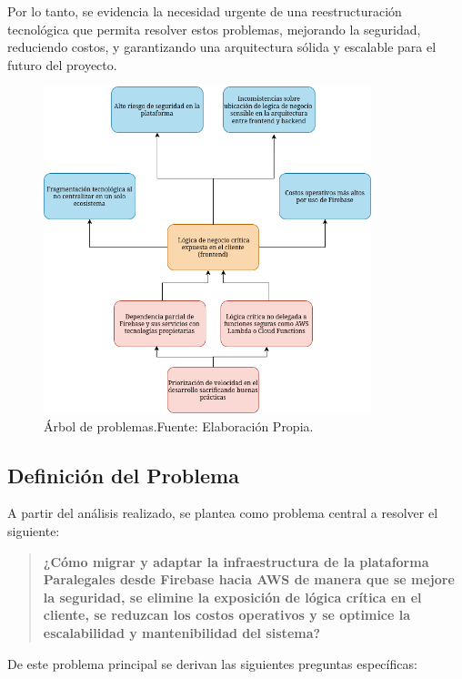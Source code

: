 Por lo tanto, se evidencia la necesidad urgente de una reestructuración tecnológica que permita resolver estos problemas, mejorando la seguridad, reduciendo costos, y garantizando una arquitectura sólida y escalable para el futuro del proyecto.

\newcommand\captionArbolProblemas{Árbol de problemas.\hspace{1em}}

\begin{figure}[H]
  \centering
  \includegraphics[width=0.85\textwidth]{img/figures/fig2-arbol-de-problemas.png}
  \caption[\captionArbolProblemas]{\captionArbolProblemas Fuente: Elaboración Propia.}
  \label{fig:arbol_problemas}
\end{figure}

\subsection{Definición del Problema}
A partir del análisis realizado, se plantea como problema central a resolver el siguiente:
\begin{quote}
  \textbf{¿Cómo migrar y adaptar la infraestructura de la plataforma Paralegales desde Firebase hacia AWS de manera que se mejore la seguridad, se elimine la exposición de lógica crítica en el cliente, se reduzcan los costos operativos y se optimice la escalabilidad y mantenibilidad del sistema?}
\end{quote}

De este problema principal se derivan las siguientes preguntas específicas:

